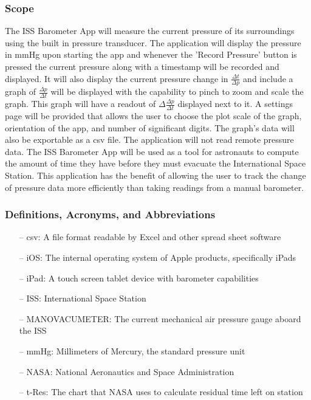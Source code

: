 \documentclass[onecolumn, draftclsnofoot,10pt, compsoc]{IEEEtran}
\def \CapstoneProjectName{ISS Barometer App }
\begin{document}
\subsubsection{Scope}
The \CapstoneProjectName will measure the current pressure of its surroundings using the built in pressure transducer.
The application will display the pressure in mmHg upon starting the app and whenever the 'Record Pressure' button is pressed the current pressure along with a timestamp will be recorded and displayed.
It will also display the current pressure change in $\frac{\Delta t}{\Delta p}$ and include a graph of $\frac{\Delta p}{\Delta t}$ will be displayed with the capability to pinch to zoom and scale the graph.
This graph will have a readout of $\Delta \frac{\Delta p}{\Delta t}$ displayed next to it.
A settings page will be provided that allows the user to choose the plot scale of the graph, orientation of the app, and number of significant digits.
The graph's data will also be exportable as a csv file.
The application will not read remote pressure data.
The \CapstoneProjectName will be used as a tool for astronauts to compute the amount of time they have before they must evacuate the International Space Station.
This application has the benefit of allowing the user to track the change of pressure data more efficiently than taking readings from a manual barometer.

\subsubsection{Definitions, Acronyms, and Abbreviations}
\begin{itemize}
\item[--] csv: A file format readable by Excel and other spread sheet software
\item[--] iOS: The internal operating system of Apple products, specifically iPads
\item[--] iPad: A touch screen tablet device with barometer capabilities
\item[--] ISS: International Space Station
\item[--] MANOVACUMETER: The current mechanical air pressure gauge aboard the ISS
\item[--] mmHg: Millimeters of Mercury, the standard pressure unit
\item[--] NASA: National Aeronautics and Space Administration
\item[--] t-Res: The chart that NASA uses to calculate residual time left on station
\end{itemize}
\end{document}
